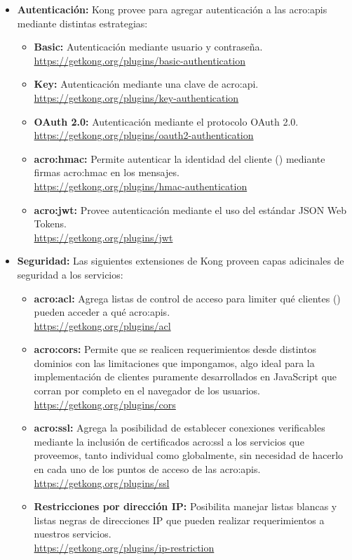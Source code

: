 \begin{itemize}
  \item \textbf{Autenticación:} Kong provee  para agregar autenticación a las \glspl{acro:api} mediante distintas estrategias:
  \begin{itemize}
    \item \textbf{Basic:} Autenticación mediante usuario y contraseña. \\
    \url{https://getkong.org/plugins/basic-authentication}
    \item \textbf{Key:} Autenticación mediante una clave de \gls{acro:api}. \\
    \url{https://getkong.org/plugins/key-authentication}
    \item \textbf{OAuth 2.0:} Autenticación mediante el protocolo OAuth 2.0. \\
    \url{https://getkong.org/plugins/oauth2-authentication}
    \item \textbf{\gls{acro:hmac}:} Permite autenticar la identidad del cliente () mediante firmas \gls{acro:hmac} en los mensajes. \\
    \url{https://getkong.org/plugins/hmac-authentication}
    \item \textbf{\gls{acro:jwt}:} Provee autenticación mediante el uso del estándar JSON Web Tokens. \\
    \url{https://getkong.org/plugins/jwt}
  \end{itemize}

  \item \textbf{Seguridad:} Las siguientes extensiones de Kong proveen capas adicinales de seguridad a los servicios:
  \begin{itemize}
    \item \textbf{\gls{acro:acl}:} Agrega listas de control de acceso para limiter qué clientes () pueden acceder a qué \glspl{acro:api}. \\
    \url{https://getkong.org/plugins/acl}
    \item \textbf{\gls{acro:cors}:} Permite que se realicen requerimientos desde distintos dominios con las limitaciones que impongamos, algo ideal para la implementación de clientes puramente desarrollados en JavaScript que corran por completo en el navegador de los usuarios. \\
    \url{https://getkong.org/plugins/cors}
    \item \textbf{\gls{acro:ssl}:} Agrega la posibilidad de establecer conexiones verificables mediante la inclusión de certificados \gls{acro:ssl} a los servicios que proveemos, tanto individual como globalmente, sin necesidad de hacerlo en cada uno de los puntos de acceso de las \glspl{acro:api}. \\
    \url{https://getkong.org/plugins/ssl}
    \item \textbf{Restricciones por dirección IP:} Posibilita manejar listas blancas y listas negras de direcciones IP que pueden realizar requerimientos a nuestros servicios. \\
    \url{https://getkong.org/plugins/ip-restriction}
  \end{itemize}


\end{itemize}
